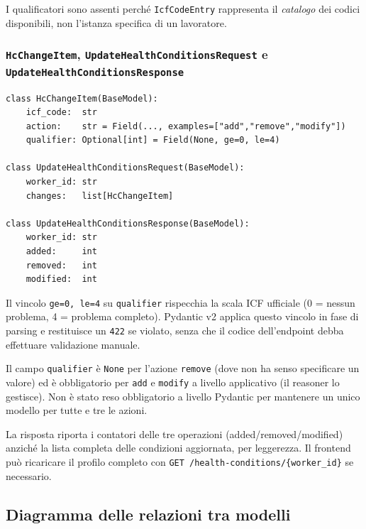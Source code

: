 \documentclass[a4paper,12pt]{article}
\begin{document}
I qualificatori sono assenti perch\'{e} \texttt{IcfCodeEntry} rappresenta
il \textit{catalogo} dei codici disponibili, non l'istanza specifica
di un lavoratore.

\subsubsection{\texttt{HcChangeItem}, \texttt{UpdateHealthConditionsRequest} e\\[2pt] \texttt{UpdateHealthConditionsResponse}}

\begin{lstlisting}[caption={Modelli per l'aggiornamento batch delle condizioni ICF.}]
class HcChangeItem(BaseModel):
    icf_code:  str
    action:    str = Field(..., examples=["add","remove","modify"])
    qualifier: Optional[int] = Field(None, ge=0, le=4)

class UpdateHealthConditionsRequest(BaseModel):
    worker_id: str
    changes:   list[HcChangeItem]

class UpdateHealthConditionsResponse(BaseModel):
    worker_id: str
    added:     int
    removed:   int
    modified:  int
\end{lstlisting}

\noindent Il vincolo \texttt{ge=0, le=4} su \texttt{qualifier} rispecchia la
scala ICF ufficiale (0 = nessun problema, 4 = problema completo).
Pydantic v2 applica questo vincolo in fase di parsing e restituisce
un \texttt{422} se violato, senza che il codice dell'endpoint debba
effettuare validazione manuale.

Il campo \texttt{qualifier} \`{e} \texttt{None} per l'azione
\texttt{remove} (dove non ha senso specificare un valore) ed
\`{e} obbligatorio per \texttt{add} e \texttt{modify} a livello
applicativo (il reasoner lo gestisce). Non \`{e} stato reso
obbligatorio a livello Pydantic per mantenere un unico modello
per tutte e tre le azioni.

La risposta riporta i contatori delle tre operazioni (added/removed/modified)
anzich\'{e} la lista completa delle condizioni aggiornata, per leggerezza.
Il frontend pu\`{o} ricaricare il profilo completo con
\texttt{GET /health-conditions/\{worker\_\allowbreak{}id\}} se necessario.

\subsection{Diagramma delle relazioni tra modelli}
\end{document}
